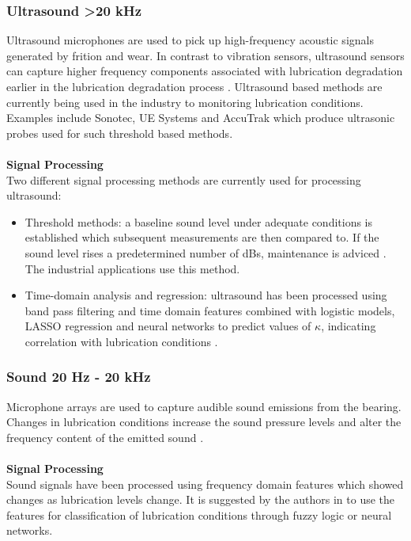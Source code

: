 \subsubsection{Ultrasound \textgreater 20 kHz}
Ultrasound microphones are used to pick up high-frequency acoustic signals generated by frition and wear. In contrast to vibration sensors, ultrasound sensors can capture higher frequency components associated with lubrication degradation earlier in the lubrication degradation process \cite{jakobsen_detecting_2023}. Ultrasound based methods are currently being used in the industry to monitoring lubrication conditions. Examples include Sonotec, UE Systems and AccuTrak which produce ultrasonic probes used for such threshold based methods.
\\\\
\textbf{Signal Processing}\\
Two different signal processing methods are currently used for processing ultrasound:
\begin{itemize}
    \item Threshold methods: a baseline sound level under adequate conditions is established which subsequent measurements are then compared to. If the sound level rises a predetermined number of dBs, maintenance is adviced \cite{lineham_ultrasonic_2008}. The industrial applications use this method.
    \item Time-domain analysis and regression: ultrasound has been processed using band pass filtering and time domain features combined with logistic models, LASSO regression and neural networks to predict values of $\kappa$, indicating correlation with lubrication conditions \cite{jakobsen_detecting_2023}.
\end{itemize}

\subsubsection{Sound 20 Hz - 20 kHz}
Microphone arrays are used to capture audible sound emissions from the bearing. Changes in lubrication conditions increase the sound pressure levels and alter the frequency content of the emitted sound \cite{georgiev_microphone_2017}.
\\\\
\textbf{Signal Processing}\\
Sound signals have been processed using frequency domain features which showed changes as lubrication levels change. It is suggested by the authors in \cite{georgiev_microphone_2017} to use the features for classification of lubrication conditions through fuzzy logic or neural networks.
